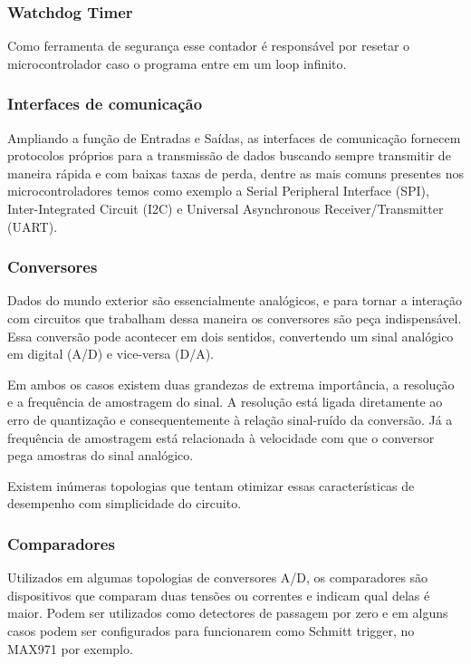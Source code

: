 \subsubsection*{Watchdog Timer}

Como ferramenta de segurança esse contador é responsável por resetar o microcontrolador caso o programa entre em um loop infinito.

\subsubsection{Interfaces de comunicação}

Ampliando a função de Entradas e Saídas, as interfaces de comunicação fornecem protocolos próprios para a transmissão de dados buscando sempre transmitir de maneira rápida e com baixas taxas de perda, dentre as mais comuns presentes nos microcontroladores temos como exemplo a Serial Peripheral Interface (SPI), Inter-Integrated Circuit (I2C) e Universal Asynchronous Receiver/Transmitter (UART).

\subsubsection{Conversores}
\label{sec:conversores}

Dados do mundo exterior são essencialmente analógicos, e para tornar a interação com circuitos que trabalham dessa maneira os conversores são peça indispensável. Essa conversão pode acontecer em dois sentidos, convertendo um sinal analógico em digital (A/D) e vice-versa (D/A).

Em ambos os casos existem duas grandezas de extrema importância, a resolução e a frequência de amostragem do sinal. A resolução está ligada diretamente ao erro de quantização e consequentemente à relação sinal-ruído da conversão. Já a frequência de amostragem está relacionada à velocidade com que o conversor pega amostras do sinal analógico.

Existem inúmeras topologias que tentam otimizar essas características de desempenho com simplicidade do circuito.

\subsubsection*{Comparadores}

Utilizados em algumas topologias de conversores A/D, os comparadores são dispositivos que comparam duas tensões ou correntes e indicam qual delas é maior. Podem ser utilizados como detectores de passagem por zero e em alguns casos podem ser configurados para funcionarem como Schmitt trigger, no MAX971 \cite{Integrated2003} por exemplo.

